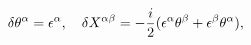 \begin{equation}\label{4}
\delta\theta^{\alpha}=\epsilon^{\alpha}, \quad \delta X^{\alpha\beta}=-{i\over
2}(\epsilon^{\alpha}\theta^\beta+\epsilon^{\beta}\theta^\alpha),
\end{equation}

